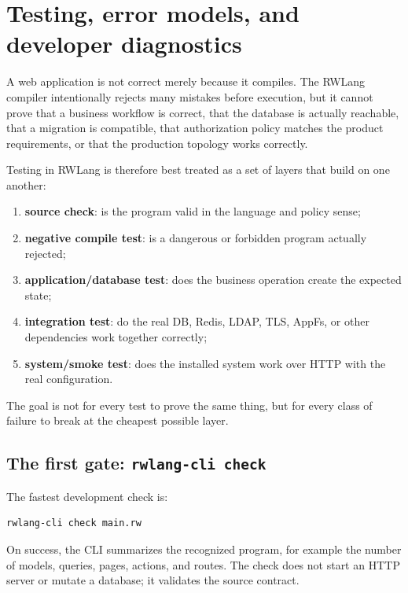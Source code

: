 \chapter{Testing, error models, and developer diagnostics}

A web application is not correct merely because it compiles. The RWLang compiler intentionally rejects many mistakes before execution, but it cannot prove that a business workflow is correct, that the database is actually reachable, that a migration is compatible, that authorization policy matches the product requirements, or that the production topology works correctly.

Testing in RWLang is therefore best treated as a set of layers that build on one another:

\begin{enumerate}
  \item \textbf{source check}: is the program valid in the language and policy sense;
  \item \textbf{negative compile test}: is a dangerous or forbidden program actually rejected;
  \item \textbf{application/database test}: does the business operation create the expected state;
  \item \textbf{integration test}: do the real DB, Redis, LDAP, TLS, AppFs, or other dependencies work together correctly;
  \item \textbf{system/smoke test}: does the installed system work over HTTP with the real configuration.
\end{enumerate}

The goal is not for every test to prove the same thing, but for every class of failure to break at the cheapest possible layer.

\section{The first gate: \texttt{rwlang-cli check}}

The fastest development check is:

\begin{lstlisting}
rwlang-cli check main.rw
\end{lstlisting}

On success, the CLI summarizes the recognized program, for example the number of models, queries, pages, actions, and routes. The check does not start an HTTP server or mutate a database; it validates the source contract.


